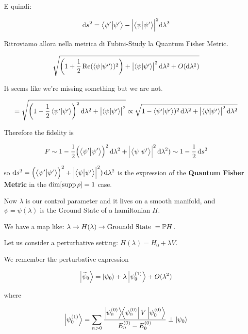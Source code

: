 \documentclass[main.tex]{subfiles}
\begin{document}
E quindi:

\begin{align*}
\dd{s^2} = \braket{\psi'}{\psi'}-\abs{\braket{\psi}{\psi'}}^2 \dd\lambda^2
\end{align*}

Ritroviamo allora nella metrica di Fubini-Study la Quantum Fisher Metric.

\begin{equation}
  \sqrt{\qty(1+ \frac{1}{2} \Re(\braket{\psi}{\psi''} )^2) + \abs{\braket{\psi}{\psi'} }^2 \dd{\lambda^2} + O(\dd{\lambda^2}) }
\end{equation}

It seems like we're missing something but we are not.

\begin{equation}
  = \sqrt{\qty(1 - \frac{1}{2} \braket{\psi'}{\psi'} )^2 \dd{\lambda^2} + \abs{\braket{\psi}{\psi'} }^2 }
  \propto \sqrt{1 - \braket{\psi'}{\psi'} )^2 \dd{\lambda^2}  + \abs{\braket{\psi}{\psi'} }^2 \dd{\lambda^2}}
\end{equation}

Therefore the fidelity is

\begin{equation}
  F \sim 1 - \frac{1}{2} \qty(\braket{\psi'}{\psi'} )^2 \dd{\lambda^2}  + \abs{\braket{\psi}{\psi'} }^2 \dd{\lambda^2})
  \sim 1 - \frac{1}{2}\dd{s^2}
\end{equation}

so \(\dd{s^2} = \qty(\braket{\psi'}{\psi'} )^2  + \abs{\braket{\psi}{\psi'} }^2) \dd{\lambda^2}\)
is the expression of the \textbf{Quantum Fisher Metric} in the \(\dim \qty[ \supp{\rho}] = 1\) case.

Now \(\lambda\) is our control parameter and it lives on a smooth manifold, and \(\psi = \psi(\lambda)\) is the Ground State of a hamiltonian \(H\).

We have a map like: \(\lambda \rightarrow H(\lambda) \rightarrow \text{Groundd State }  = \P H\).

Let us consider a perturbative setting: \(H(\lambda) = H_0 + \lambda V\).

We remember the perturbative expression

\begin{equation}
  \ket{\widetilde{\psi}_0 } = \ket{\psi_0} + \lambda \ket{\psi_0^{(1)}} + O(\lambda^2)
\end{equation}

where

\begin{equation}
  \ket{\psi_0 ^{(1)} } = \sum _{n>0} \frac{\dyad{\psi_n ^{(0)}} V \ket{\psi_0 ^{(0)} }}{E_n ^{(0)}  -  E_0 ^{(0)} } \perp \ket{\psi_0}
\end{equation}
\end{document}
